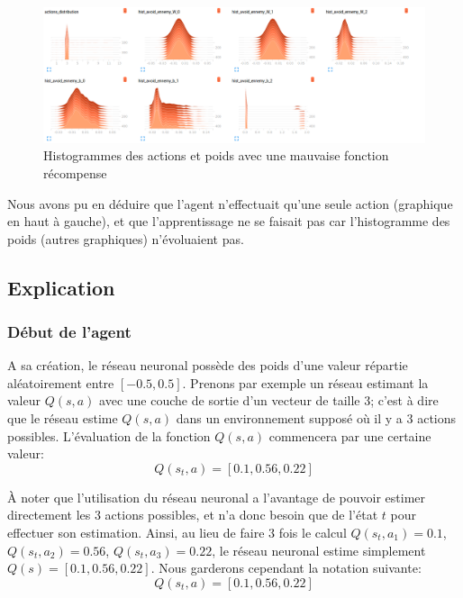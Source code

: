 \documentclass[11pt,a4paper]{report}
\begin{document}
  \begin{figure}[!h]
   \center
   \includegraphics[scale=0.4]{ressources/bad_reward_histograms.png}
   \caption{Histogrammes des actions et poids avec une mauvaise fonction récompense}
   \end{figure} 
   
 \par Nous avons pu en déduire que l'agent n'effectuait qu'une seule action (graphique en haut à gauche), et que l'apprentissage ne se faisait pas car l'histogramme des poids (autres graphiques) n'évoluaient pas. 
  
  \subsection{Explication}
  
  \subsubsection{Début de l'agent}
  
  \par A sa création, le réseau neuronal possède des poids d'une valeur répartie aléatoirement entre $[-0.5,0.5]$. Prenons par exemple un réseau estimant la valeur $Q(s,a)$ avec une couche de sortie d'un vecteur de taille 3; c'est à dire que le réseau estime $Q(s,a)$ dans un environnement supposé où il y a 3 actions possibles. L'évaluation de la fonction $Q(s,a)$ commencera par une certaine valeur: 
  $$Q(s_t, a) = [0.1, 0.56, 0.22]$$
  
  \par À noter que l'utilisation du réseau neuronal a l'avantage de pouvoir estimer directement les 3 actions possibles, et n'a donc besoin que de l'état $t$ pour effectuer son estimation. Ainsi, au lieu de faire 3 fois le calcul $Q(s_t,a_1) = 0.1$, $Q(s_t,a_2) = 0.56$, $Q(s_t,a_3) = 0.22$, le réseau neuronal estime simplement $Q(s) = [0.1, 0.56, 0.22]$. Nous garderons cependant la notation suivante: 
  $$Q(s_t, a) = [0.1, 0.56, 0.22]$$
  
\end{document}
